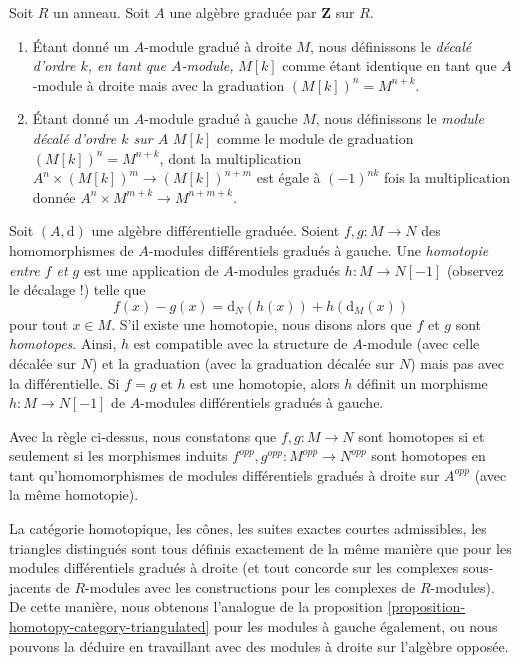 \begin{definition}
\label{definition-shift-graded-module}
Soit $R$ un anneau. Soit $A$ une algèbre graduée par $\mathbf{Z}$ sur $R$.
\begin{enumerate}
\item Étant donné un $A$-module gradué à droite $M$, nous définissons le
{\it décalé d'ordre $k$, en tant que $A$-module,} $M[k]$ comme étant
identique en tant que $A$-module à droite mais avec la graduation $(M[k])^n = M^{n + k}$.
\item Étant donné un $A$-module gradué à gauche $M$, nous
définissons le {\it module décalé d'ordre $k$ sur $A$} $M[k]$
comme le module de graduation $(M[k])^n = M^{n + k}$, dont la
multiplication $A^n \times (M[k])^m \to
(M[k])^{n + m}$ est égale à $(-1)^{nk}$ fois la multiplication
donnée $A^n \times M^{m + k} \to M^{n + m + k}$.
\end{enumerate}
\end{definition}

\noindent
Soit $(A, \text{d})$ une algèbre différentielle graduée. Soient
$f, g : M \to N$ des homomorphismes de $A$-modules différentiels gradués à gauche. Une
{\it homotopie entre $f$ et $g$} est une application de $A$-modules
gradués $h : M \to N[-1]$ (observez le décalage !) telle que
$$
f(x) - g(x) = \text{d}_N(h(x)) + h(\text{d}_M(x))
$$
pour tout $x \in M$. S'il existe une homotopie, nous disons alors que $f$ et
$g$ sont {\it homotopes}. Ainsi, $h$ est compatible avec la structure de
$A$-module (avec celle décalée sur $N$) et la graduation (avec la graduation décalée sur
$N$) mais pas avec la différentielle. Si $f = g$ et $h$ est une homotopie, alors
$h$ définit un morphisme $h : M \to N[-1]$ de $A$-modules différentiels
gradués à gauche.

\medskip\noindent
Avec la règle ci-dessus, nous constatons que $f, g : M \to N$ sont homotopes
si et seulement si les morphismes induits
$f^{opp}, g^{opp} : M^{opp} \to N^{opp}$ sont
homotopes en tant qu'homomorphismes de modules différentiels gradués à droite sur
$A^{opp}$ (avec la même homotopie).

\medskip\noindent
La catégorie homotopique, les cônes, les suites exactes courtes
admissibles, les triangles distingués sont tous définis exactement de la même manière
que pour les modules différentiels gradués à droite (et tout concorde sur
les complexes sous-jacents de $R$-modules avec les constructions pour les
complexes de $R$-modules). De cette manière, nous obtenons l'analogue de la
proposition \ref{proposition-homotopy-category-triangulated} pour les
modules à gauche également, ou nous pouvons la déduire en travaillant
avec des modules à droite sur l'algèbre opposée.



